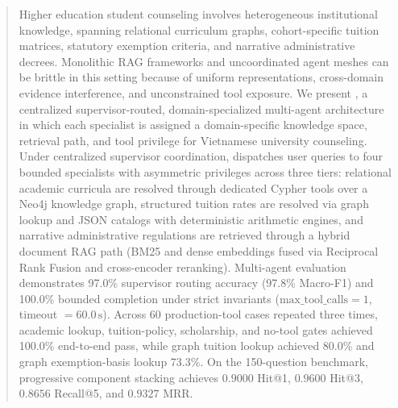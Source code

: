 \begin{abstract}
Higher education student counseling involves heterogeneous institutional knowledge, spanning relational curriculum graphs, cohort-specific tuition matrices, statutory exemption criteria, and narrative administrative decrees. Monolithic RAG frameworks and uncoordinated agent meshes can be brittle in this setting because of uniform representations, cross-domain evidence interference, and unconstrained tool exposure. We present \textbf{\system{}}, a centralized supervisor-routed, domain-specialized multi-agent architecture in which each specialist is assigned a domain-specific knowledge space, retrieval path, and tool privilege for Vietnamese university counseling. Under centralized supervisor coordination, \system{} dispatches user queries to four bounded specialists with asymmetric privileges across three tiers: relational academic curricula are resolved through dedicated Cypher tools over a Neo4j knowledge graph, structured tuition rates are resolved via graph lookup and JSON catalogs with deterministic arithmetic engines, and narrative administrative regulations are retrieved through a hybrid document RAG path (BM25 and dense embeddings fused via Reciprocal Rank Fusion and cross-encoder reranking). Multi-agent evaluation demonstrates 97.0\% supervisor routing accuracy (97.8\% Macro-F1) and 100.0\% bounded completion under strict invariants ($\text{max\_tool\_calls}=1$, timeout $=60.0\,\text{s}$). Across 60 production-tool cases repeated three times, academic lookup, tuition-policy, scholarship, and no-tool gates achieved 100.0\% end-to-end pass, while graph tuition lookup achieved 80.0\% and graph exemption-basis lookup 73.3\%. On the 150-question benchmark, progressive component stacking achieves $0.9000$ Hit@1, $0.9600$ Hit@3, $0.8656$ Recall@5, and $0.9327$ MRR.

\end{abstract}
